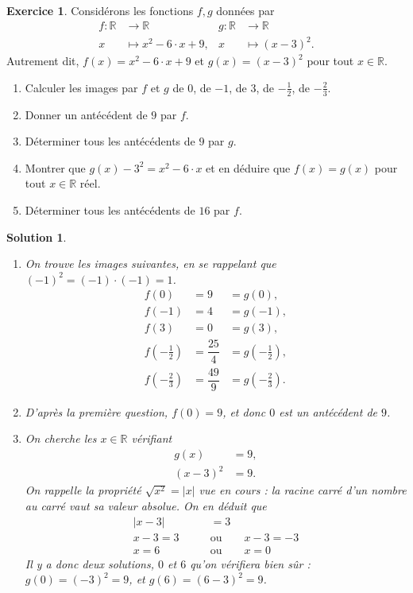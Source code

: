 \documentclass[a4paper, 14pt]{extarticle}
\theoremstyle{plain}
\newtheorem*{sol}{Solution}
\theoremstyle{definition}
\newtheorem{ex}{Exercice}
\newcommand{\R}{\mathbb{R}}
\newcommand{\exe}[2]{
		\begin{ex} #1  \end{ex}
		\begin{sol} #2 \end{sol}
	}
\newcommand{\exe}[2]{
		\begin{ex} #1  \end{ex}
	}
\begin{document}
	\exe{
		Considérons les fonctions $f,g$ données par
		\begin{align*}
			f: \R & \longrightarrow \R &g: \R & \longrightarrow \R \\
			x& \longmapsto x^2 -6\cdot x + 9,  &x& \longmapsto (x-3)^2. 
		\end{align*}
		Autrement dit, $f(x) =x^2 -6\cdot x + 9$ et $g(x)=(x-3)^2$ pour tout $x\in\R$.
		
		\begin{enumerate}
			\item
			Calculer les images par $f$ et $g$ de $0$, de $-1$, de $3$, de $-\frac12$, de $-\frac23$.
			\item
			Donner un antécédent de $9$ par $f$.
			\item
			Déterminer tous les antécédents de $9$ par $g$.	
			\item
			Montrer que $g(x) - 3^2 = x^2 - 6\cdot x$ et en déduire que $f(x) = g(x)$ pour tout $x\in\R$ réel.
			\item 
			Déterminer tous les antécédents de $16$ par $f$.
		\end{enumerate}
	}{
	
		\begin{enumerate}
			\item
			On trouve les images suivantes, en se rappelant que $(-1)^2 = (-1) \cdot (-1) = 1$.
				\begin{align*}
					f(0) &= 9 &= g(0), \\
					f(-1) &= 4 &= g(-1), \\
					f(3) &= 0 &= g(3), \\
					f\left(-\frac12\right) &= \dfrac{25}4 &= g\left(-\frac12\right), \\
					f\left(-\frac23\right) &= \dfrac{49}9 &= g\left(-\frac23\right).
				\end{align*}
			
			\item
			D'après la première question, $f(0) = 9$, et donc $0$ est un antécédent de $9$.
			
			\item
			On cherche les $x\in\R$ vérifiant
				\begin{align*}
					g(x) &= 9, \\
					(x-3)^2 &= 9.
				\end{align*}
			On rappelle la propriété $\sqrt{x^2} = |x|$ vue en cours : la racine carré d'un nombre au carré vaut sa valeur absolue.
			On en déduit que
				\begin{align*}
					|x-3| &= 3 \\
					x-3=3 \qquad&\text{ou}\qquad x-3 = -3 \\
					x = 6  \qquad&\text{ou}\qquad  x=0
				\end{align*}
 			Il y a donc deux solutions, $0$ et $6$ qu'on vérifiera bien sûr : $g(0) = (-3)^2 = 9$, et $g(6) = (6-3)^2 = 9$.
	

\end{enumerate}}
\end{document}
